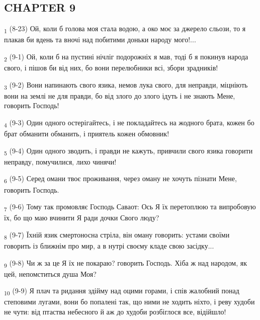 \subsection{CHAPTER 9}
\begin{tcolorbox}
\textsubscript{1} (8-23) Ой, коли б голова моя стала водою, а око моє за джерело сльози, то я плакав би вдень та вночі над побитими доньки народу мого!...
\end{tcolorbox}
\begin{tcolorbox}
\textsubscript{2} (9-1) Ой, коли б на пустині нічліг подорожніх я мав, тоді б я покинув народа свого, і пішов би від них, бо вони перелюбники всі, збори зрадників!
\end{tcolorbox}
\begin{tcolorbox}
\textsubscript{3} (9-2) Вони напинають свого язика, немов лука свого, для неправди, міцніють вони на землі не для правди, бо від злого до злого ідуть і не знають Мене, говорить Господь!
\end{tcolorbox}
\begin{tcolorbox}
\textsubscript{4} (9-3) Один одного остерігайтесь, і не покладайтесь на жодного брата, кожен бо брат обманити обманить, і приятель кожен обмовник!
\end{tcolorbox}
\begin{tcolorbox}
\textsubscript{5} (9-4) Один одного зводить, і правди не кажуть, привчили свого язика говорити неправду, помучилися, лихо чинячи!
\end{tcolorbox}
\begin{tcolorbox}
\textsubscript{6} (9-5) Серед омани твоє проживання, через оману не хочуть пізнати Мене, говорить Господь.
\end{tcolorbox}
\begin{tcolorbox}
\textsubscript{7} (9-6) Тому так промовляє Господь Саваот: Ось Я їх перетоплюю та випробовую їх, бо що маю вчинити Я ради дочки Свого люду?
\end{tcolorbox}
\begin{tcolorbox}
\textsubscript{8} (9-7) Їхній язик смертоносна стріла, він оману говорить: устами своїми говорить із ближнім про мир, а в нутрі своєму кладе свою засідку...
\end{tcolorbox}
\begin{tcolorbox}
\textsubscript{9} (9-8) Чи ж за це Я їх не покараю? говорить Господь. Хіба ж над народом, як цей, непомститься душа Моя?
\end{tcolorbox}
\begin{tcolorbox}
\textsubscript{10} (9-9) Я плач та ридання здійму над оцими горами, і спів жалобний понад степовими лугами, вони бо попалені так, що ними не ходить ніхто, і реву худоби не чути: від птаства небесного й аж до худоби розбіглося все, відійшло!
\end{tcolorbox}
